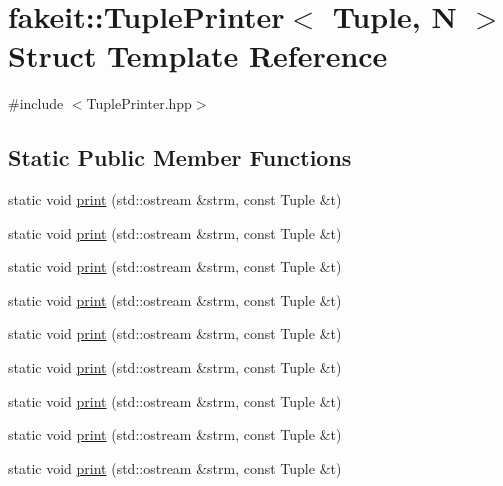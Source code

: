 \hypertarget{structfakeit_1_1TuplePrinter}{}\section{fakeit\+::Tuple\+Printer$<$ Tuple, N $>$ Struct Template Reference}
\label{structfakeit_1_1TuplePrinter}


{\ttfamily \#include $<$Tuple\+Printer.\+hpp$>$}

\subsection*{Static Public Member Functions}
\begin{DoxyCompactItemize}
\item 
static void \mbox{\hyperlink{structfakeit_1_1TuplePrinter_a1c46b4cc8914280abd0f6a83a56db9b9}{print}} (std\+::ostream \&strm, const Tuple \&t)
\item 
static void \mbox{\hyperlink{structfakeit_1_1TuplePrinter_a1c46b4cc8914280abd0f6a83a56db9b9}{print}} (std\+::ostream \&strm, const Tuple \&t)
\item 
static void \mbox{\hyperlink{structfakeit_1_1TuplePrinter_a1c46b4cc8914280abd0f6a83a56db9b9}{print}} (std\+::ostream \&strm, const Tuple \&t)
\item 
static void \mbox{\hyperlink{structfakeit_1_1TuplePrinter_a1c46b4cc8914280abd0f6a83a56db9b9}{print}} (std\+::ostream \&strm, const Tuple \&t)
\item 
static void \mbox{\hyperlink{structfakeit_1_1TuplePrinter_a1c46b4cc8914280abd0f6a83a56db9b9}{print}} (std\+::ostream \&strm, const Tuple \&t)
\item 
static void \mbox{\hyperlink{structfakeit_1_1TuplePrinter_a1c46b4cc8914280abd0f6a83a56db9b9}{print}} (std\+::ostream \&strm, const Tuple \&t)
\item 
static void \mbox{\hyperlink{structfakeit_1_1TuplePrinter_a1c46b4cc8914280abd0f6a83a56db9b9}{print}} (std\+::ostream \&strm, const Tuple \&t)
\item 
static void \mbox{\hyperlink{structfakeit_1_1TuplePrinter_a1c46b4cc8914280abd0f6a83a56db9b9}{print}} (std\+::ostream \&strm, const Tuple \&t)
\item 
static void \mbox{\hyperlink{structfakeit_1_1TuplePrinter_a1c46b4cc8914280abd0f6a83a56db9b9}{print}} (std\+::ostream \&strm, const Tuple \&t)
\end{DoxyCompactItemize}


